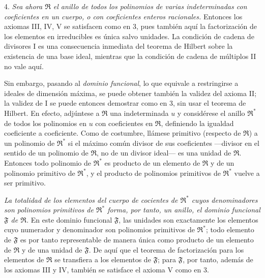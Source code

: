 \documentclass[11pt]{article}
\providecommand{\mR}{\mathfrak{R}}
\providecommand{\mF}{\mathfrak{F}}
\begin{document}
4. \emph{Sea ahora $\mR$ el anillo de todos los polinomios de varias indeterminadas con coeficientes en un cuerpo, o con coeficientes enteros racionales.} Entonces los axiomas III, IV, V se satisfacen como en 3, pues también aquí la factorización de los elementos en irreducibles es única salvo unidades. La condición de cadena de divisores I es una consecuencia inmediata del teorema de Hilbert sobre la existencia de una base ideal, mientras que la condición de cadena de múltiplos II no vale aquí.

Sin embargo, pasando al \emph{dominio funcional}, lo que equivale a restringirse a ideales de dimensión máxima, se puede obtener también la validez del axioma II; la validez de I se puede entonces demostrar como en 3, sin usar el teorema de Hilbert. En efecto, adjúntese a $\mR$ una indeterminada $u$ y considérese el anillo $\mR^*$ de todos los polinomios en $u$ con coeficientes en $\mR$, definiendo la igualdad coeficiente a coeficiente. Como de costumbre, llámese primitivo (respecto de $\mR$) a un polinomio de $\mR^*$ si el máximo común divisor de sus coeficientes ---divisor en el sentido de un polinomio de $\mR$, no de un divisor ideal--- es una unidad de $\mR$. Entonces todo polinomio de $\mR^*$ es producto de un elemento de $\mR$ y de un polinomio primitivo de $\mR^*$, y el producto de polinomios primitivos de $\mR^*$ vuelve a ser primitivo.

\emph{La totalidad de los elementos del cuerpo de cocientes de $\mR^*$ cuyos denominadores son polinomios primitivos de $\mR^*$ forma, por tanto, un anillo, el dominio funcional $\mF$ de $\mR$.} En este dominio funcional $\mF$, las unidades son exactamente los elementos cuyo numerador y denominador son polinomios primitivos de $\mR^*$; todo elemento de $\mF$ es por tanto representable de manera única como producto de un elemento de $\mR$ y de una unidad de $\mF$. De aquí que el teorema de factorización para los elementos de $\mR$ se transfiera a los elementos de $\mF$; para $\mF$, por tanto, además de los axiomas III y IV, también se satisface el axioma V como en 3.
\end{document}
